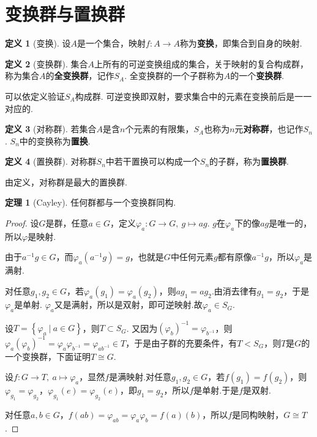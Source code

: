 \documentclass[12pt]{ctexart}
\theoremstyle{definition}
\newtheorem{definition}{定义}[section]
\newtheorem{theorem}{定理}[section]
\theoremstyle{plain}
\begin{document}
\section{变换群与置换群}
	\begin{definition}[变换]
	设$A$是一个集合，映射$f:A\to A$称为\textbf{变换}，即集合到自身的映射.
\end{definition}
\begin{definition}[变换群]
	集合$A$上所有的可逆变换组成的集合，关于映射的复合构成群，称为集合$A$的\textbf{全变换群}，记作$S_A$. 全变换群的一个子群称为$A$的一个\textbf{变换群}.
\end{definition}
可以依定义验证$S_A$构成群. 可逆变换即双射，要求集合中的元素在变换前后是一一对应的.
\begin{definition}[对称群]
	若集合$A$是含$n$个元素的有限集，$S_A$也称为$n$元\textbf{对称群}，也记作$S_n$. $S_n$中的变换称为\textbf{置换}.
\end{definition}
\begin{definition}[置换群]
	对称群$S_n$中若干置换可以构成一个$S_n$的子群，称为\textbf{置换群}.
\end{definition}
由定义，对称群是最大的置换群.
\begin{theorem}[Cayley]
	任何群都与一个变换群同构.
\end{theorem}
\begin{proof}
	设$G$是群，任意$a\in G$，定义$\varphi_a:G\to G,\ g\mapsto ag$. $g$在$\varphi_a$下的像$ag$是唯一的，所以$\varphi$是映射.
	
	由于$a^{-1}g\in G$，而$\varphi_a(a^{-1}g)=g$，也就是$G$中任何元素$g$都有原像$a^{-1}g$，所以$\varphi_a$是满射.
	
	对任意$g_1,g_2\in G$，若$\varphi_a(g_1)=\varphi_a(g_2)$，则$ag_1=ag_2$.由消去律有$g_1=g_2$，于是$\varphi_a$是单射. $\varphi_a$又是满射，所以是双射，即可逆映射.故$\varphi_a\in S_G$.
	
	设$T=\left\{\varphi_a\ |\ a\in G\right\}$，则$T\subset S_G$. 又因为$(\varphi_b)^{-1}=\varphi_{b^{-1}}$，则$\varphi_a(\varphi_b)^{-1}=\varphi_a\varphi_{b^{-1}}=\varphi_{ab^{-1}}\in T$，于是由子群的充要条件，有$T<S_G$，则$T$是$G$的一个变换群，下面证明$T\cong G$.
	
	设$f:G\to T,\ a\mapsto\varphi_a$，显然$f$是满映射.对任意$g_1,g_2\in G$，若$f(g_1)=f(g_2)$，则$\varphi_{g_1}=\varphi_{g_2}$，$\varphi_{g_1}(e)=\varphi_{g_2}(e)$，即$g_1=g_2$，所以$f$是单射.于是$f$是双射.
	
	对任意$a,b\in G$，$f(ab)=\varphi_{ab}=\varphi_a\varphi_b=f(a)(b)$，所以$f$是同构映射，$G\cong T$.
\end{proof}
\end{document}
